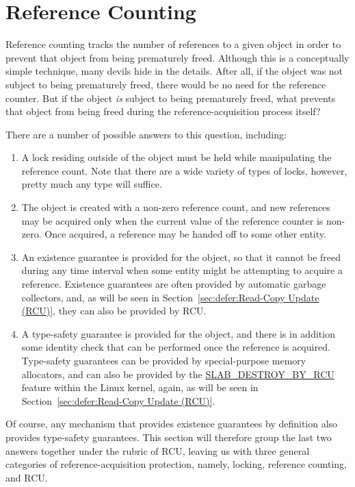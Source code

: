 
\section{Reference Counting}
\label{sec:defer:Reference Counting}

Reference counting tracks the number of references
to a given object in order to prevent that object from being prematurely
freed.
Although this is a conceptually simple technique, many devils hide in
the details.
After all, if the object was not subject to being prematurely freed,
there would be no need for the reference counter.
But if the object \emph{is} subject to being prematurely freed,
what prevents that object from being freed during
the reference-acquisition process itself?

There are a number of possible answers to this question, including:

\begin{enumerate}
\item	A lock residing outside of the object must be held while
	manipulating the reference count.
	Note that there are a wide variety of types of locks,
	however, pretty much any type will suffice.
\item	The object is created with a non-zero reference count, and new
	references may be acquired only when the current value of
	the reference counter is non-zero.
	Once acquired, a reference may be handed off to some
	other entity.
\item	An existence guarantee is provided for the object, so that
	it cannot be freed during any time interval when some
	entity might be attempting to acquire a reference.
	Existence guarantees are often provided by automatic
	garbage collectors, and, as will be seen in
	Section~\ref{sec:defer:Read-Copy Update (RCU)}, they can
	also be provided by RCU.
\item	A type-safety guarantee is provided for the object, and there
	is in addition some identity check that can be performed once
	the reference is acquired.
	Type-safety guarantees can be provided by special-purpose
	memory allocators, and can also be provided by the
	\url{SLAB_DESTROY_BY_RCU} feature within the Linux kernel,
	again, as will be seen in
	Section~\ref{sec:defer:Read-Copy Update (RCU)}.
\end{enumerate}

Of course, any mechanism that provides existence guarantees
by definition also provides type-safety guarantees.
This section will therefore group the last two answers together under the
rubric of RCU, leaving us with three general categories of
reference-acquisition protection, namely, locking, reference counting,
and RCU.

